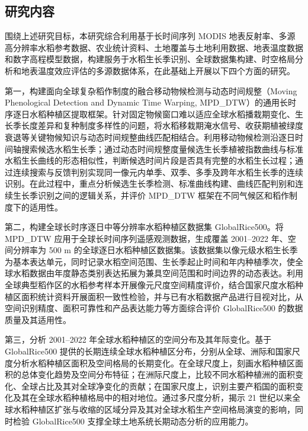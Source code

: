 \subsection{研究内容}

围绕上述研究目标，本研究综合利用基于长时间序列 MODIS 地表反射率、多源高分辨率水稻参考数据、农业统计资料、土地覆盖与土地利用数据、地表温度数据和数字高程模型数据，构建服务于水稻生长季识别、全球数据集构建、时空格局分析和地表温度效应评估的多源数据体系，在此基础上开展以下四个方面的研究。

第一，构建面向全球复杂稻作制度的融合移动物候检测与动态时间规整（Moving Phenological Detection and Dynamic Time Warping, MPD\_DTW）的通用长时序逐日水稻种植区提取框架。针对固定物候窗口难以适应全球水稻播栽期变化、生长季长度差异和复种制度多样性的问题，将水稻移栽期淹水信号、收获期植被绿度衰退等关键物候知识与动态时间规整曲线匹配相结合。利用移动物候检测沿逐日时间轴搜索候选水稻生长季；通过动态时间规整度量候选生长季植被指数曲线与标准水稻生长曲线的形态相似性，判断候选时间片段是否具有完整的水稻生长过程；通过连续搜索与反馈判别实现同一像元内单季、双季、多季及跨年水稻生长季的连续识别。在此过程中，重点分析候选生长季检测、标准曲线构建、曲线匹配判别和连续生长季识别之间的逻辑关系，并评价 MPD\_DTW 框架在不同气候区和稻作制度下的适用性。

第二，构建全球长时序逐日中等分辨率水稻种植区数据集 GlobalRice500。将 MPD\_DTW 应用于全球长时间序列遥感观测数据，生成覆盖 2001--2022 年、空间分辨率为 500 m 的全球逐日水稻种植区数据集。该数据集以像元级水稻生长季为基本表达单元，同时记录水稻空间范围、生长季起止时间和年内种植季次，使全球水稻数据由年度静态类别表达拓展为兼具空间范围和时间边界的动态表达。利用全球典型稻作区的水稻参考样本开展像元尺度空间精度评价，结合国家尺度水稻种植区面积统计资料开展面积一致性检验，并与已有水稻数据产品进行目视对比，从空间识别精度、面积可靠性和产品表达能力等方面综合评价 GlobalRice500 的数据质量及其适用性。

第三，分析 2001--2022 年全球水稻种植区的空间分布及其年际变化。基于 GlobalRice500 提供的长期连续全球水稻种植区分布，分别从全球、洲际和国家尺度分析水稻种植区面积及空间格局的长期变化。在全球尺度上，刻画水稻种植区面积的总体变化趋势及空间分布特征；在洲际尺度上，比较不同水稻种植洲的面积变化、全球占比及其对全球净变化的贡献；在国家尺度上，识别主要产稻国的面积变化及其在全球水稻种植格局中的相对地位。通过多尺度分析，揭示 21 世纪以来全球水稻种植区扩张与收缩的区域分异及其对全球水稻生产空间格局演变的影响，同时检验 GlobalRice500 支撑全球土地系统长期动态分析的应用能力。

